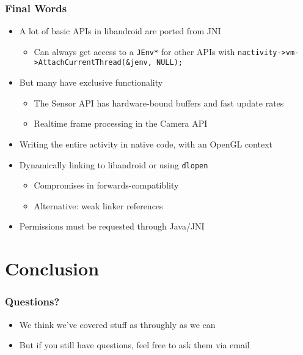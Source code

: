 \documentclass[10pt,mathserif]{beamer}
\begin{document}
	\begin{frame}
		\frametitle{Final Words}

		\begin{itemize}
			\item A lot of basic APIs in libandroid are ported from JNI
			\begin{itemize}
				\item Can always get access to a \lstinline{JEnv*} for other APIs with \lstinline{nactivity->vm->AttachCurrentThread(&jenv, NULL);}
			\end{itemize}
			\item But many have exclusive functionality
			\begin{itemize}
				\item The Sensor API has hardware-bound buffers and fast update rates
				\item Realtime frame processing in the Camera API
			\end{itemize}
			\item Writing the entire activity in native code, with an OpenGL context
			\item Dynamically linking to libandroid or using \lstinline{dlopen}
			\begin{itemize}
				\item Compromises in forwards-compatiblity
				\item Alternative: weak linker references
			\end{itemize}
			\item Permissions must be requested through Java/JNI
		\end{itemize}
	\end{frame}

	\section{Conclusion}

	\begin{frame}
		\frametitle{Questions?}

		\begin{itemize}
			\item We think we've covered stuff as throughly as we can
			\item But if you still have questions, feel free to ask them via email
		\end{itemize}

	\end{frame}
\end{document}

